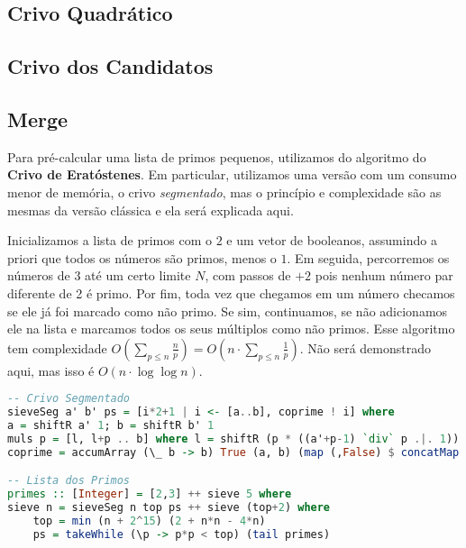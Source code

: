 \documentclass{article}
\begin{document}
\subsection{Crivo Quadrático}
\label{quadraticSieve}

\subsection{Crivo dos Candidatos}
\label{sieve}

\subsection{Merge}
\label{merge}

Para pré-calcular uma lista de primos pequenos, utilizamos do algoritmo do \textbf{Crivo de Eratóstenes}. Em particular, utilizamos uma versão com um consumo menor de memória, o crivo \textit{segmentado}, mas o princípio e complexidade são as mesmas da versão clássica e ela será explicada aqui.

Inicializamos a lista de primos com o $2$ e um vetor de booleanos, assumindo a priori que todos os números são primos, menos o $1$. Em seguida, percorremos os números de $3$ até um certo limite $N$, com passos de $+2$ pois nenhum número par diferente de 2 é primo. Por fim, toda vez que chegamos em um número checamos se ele já foi marcado como não primo. Se sim, continuamos, se não adicionamos ele na lista e marcamos todos os seus múltiplos como não primos. Esse algoritmo tem complexidade $O(\sum_{p \leq n} \frac{n}{p}) = O(n \cdot \sum_{p \leq n}\frac{1}{p})$. Não será demonstrado aqui, mas isso é $O(n \cdot \log \log n)$.

\begin{minipage}{0.9\linewidth}
\begin{lstlisting}[language=haskell,caption=Crivo de Eratóstenes e Lista dos primos]
-- Crivo Segmentado
sieveSeg a' b' ps = [i*2+1 | i <- [a..b], coprime ! i] where
a = shiftR a' 1; b = shiftR b' 1
muls p = [l, l+p .. b] where l = shiftR (p * ((a'+p-1) `div` p .|. 1)) 1
coprime = accumArray (\_ b -> b) True (a, b) (map (,False) $ concatMap muls ps) :: UArray Integer Bool

-- Lista dos Primos
primes :: [Integer] = [2,3] ++ sieve 5 where
sieve n = sieveSeg n top ps ++ sieve (top+2) where
    top = min (n + 2^15) (2 + n*n - 4*n)
    ps = takeWhile (\p -> p*p < top) (tail primes)
\end{lstlisting}
\end{minipage}
\end{document}
